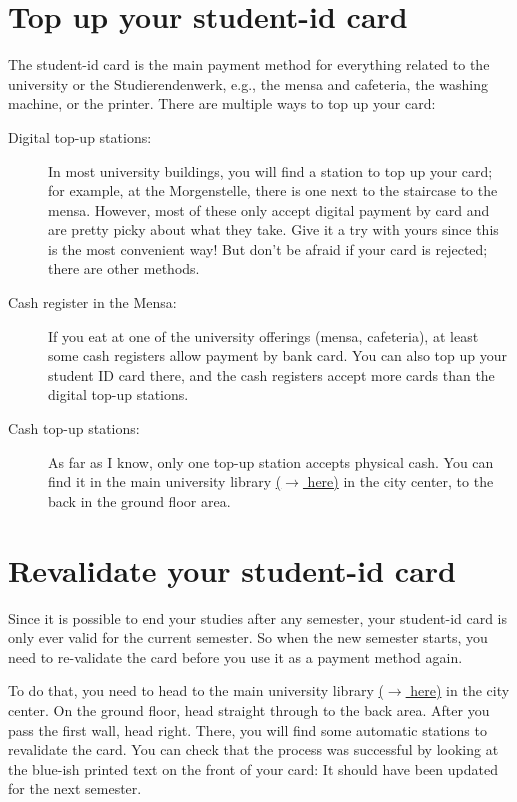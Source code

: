 \section{Top up your student-id card}
The student-id card is the main payment method for everything related to the university or the Studierendenwerk, e.g., the mensa and cafeteria, the washing machine, or the printer. There are multiple ways to top up your card:
\begin{description}
    \item[Digital top-up stations:] In most university buildings, you will find a station to top up your card; for example, at the Morgenstelle, there is one next to the staircase to the mensa. However, most of these only accept digital payment by card and are pretty picky about what they take. Give it a try with yours since this is the most convenient way! But don't be afraid if your card is rejected; there are other methods.
    \item[Cash register in the Mensa:] If you eat at one of the university offerings (mensa, cafeteria), at least some cash registers allow payment by bank card. You can also top up your student ID card there, and the cash registers accept more cards than the digital top-up stations.
    \item[Cash top-up stations:] As far as I know, only one top-up station accepts physical cash. You can find it in the main university library \href{https://maps.app.goo.gl/ifwoMYV6JYGK6dXs7}{($\xrightarrow{}$ here)} in the city center, to the back in the ground floor area.
\end{description}

\section{Revalidate your student-id card}
Since it is possible to end your studies after any semester, your student-id card is only ever valid for the current semester. So when the new semester starts, you need to re-validate the card before you use it as a payment method again.

To do that, you need to head to the main university library \href{https://maps.app.goo.gl/ifwoMYV6JYGK6dXs7}{($\xrightarrow{}$ here)} in the city center. On the ground floor, head straight through to the back area. After you pass the first wall, head right. There, you will find some automatic stations to revalidate the card. You can check that the process was successful by looking at the blue-ish printed text on the front of your card: It should have been updated for the next semester.

